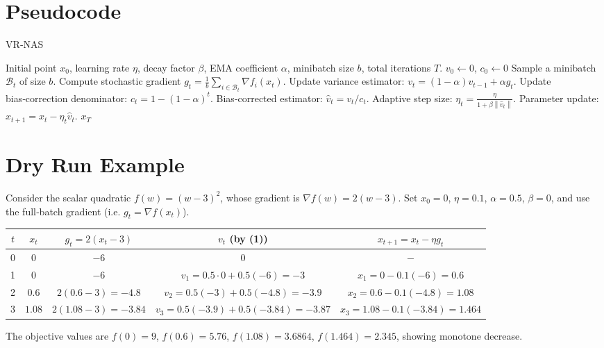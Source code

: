 \documentclass{article}
\newcommand{\norm}[1]{\left\|#1\right\|}
\newcommand{\grad}{\nabla}
\begin{document}
\section*{Pseudocode}
\begin{algorithm}[H]
\caption{VR‑NAS}
\label{alg:vrnas}
\begin{algorithmic}[1]
\REQUIRE Initial point $x_{0}$, learning rate $\eta$, decay factor $\beta$, EMA coefficient $\alpha$, minibatch size $b$, total iterations $T$.
\STATE $v_{0}\gets 0$, $c_{0}\gets 0$ 
    \STATE Sample a minibatch $\mathcal{B}_{t}$ of size $b$.
    \STATE Compute stochastic gradient $g_{t}= \frac{1}{b}\sum_{i\in\mathcal{B}_{t}}\grad f_{i}(x_{t})$.
    \STATE Update variance estimator: $v_{t}= (1-\alpha)v_{t-1}+ \alpha g_{t}$.
    \STATE Update bias‑correction denominator: $c_{t}=1-(1-\alpha)^{t}$.
    \STATE Bias‑corrected estimator: $\hat v_{t}= v_{t}/c_{t}$.
    \STATE Adaptive step size: $\eta_{t}= \displaystyle\frac{\eta}{1+\beta\norm{\hat v_{t}}}$.
    \STATE Parameter update: $x_{t+1}= x_{t}-\eta_{t}\hat v_{t}$.
\ENDFOR
\RETURN $x_{T}$
\end{algorithmic}
\end{algorithm}

\section*{Dry Run Example}
Consider the scalar quadratic $f(w)=(w-3)^{2}$, whose gradient is $\grad f(w)=2(w-3)$.  
Set $x_{0}=0$, $\eta=0.1$, $\alpha=0.5$, $\beta=0$, and use the full‑batch gradient (i.e. $g_{t}=\grad f(x_{t})$).  

\begin{center}
\begin{tabular}{c|c|c|c|c}
$t$ & $x_{t}$ & $g_{t}=2(x_{t}-3)$ & $v_{t}$ (by (1)) & $x_{t+1}=x_{t}-\eta g_{t}$ \\ \hline
0 & $0$ & $-6$ & $0$ & $-$ \\
1 & $0$ & $-6$ & $v_{1}=0.5\cdot0+0.5(-6)=-3$ & $x_{1}=0-0.1(-6)=0.6$ \\
2 & $0.6$ & $2(0.6-3)=-4.8$ & $v_{2}=0.5(-3)+0.5(-4.8)=-3.9$ & $x_{2}=0.6-0.1(-4.8)=1.08$ \\
3 & $1.08$ & $2(1.08-3)=-3.84$ & $v_{3}=0.5(-3.9)+0.5(-3.84)=-3.87$ & $x_{3}=1.08-0.1(-3.84)=1.464$ 
\end{tabular}
\end{center}

The objective values are $f(0)=9$, $f(0.6)=5.76$, $f(1.08)=3.6864$, $f(1.464)=2.345$, showing monotone decrease.
\end{document}
